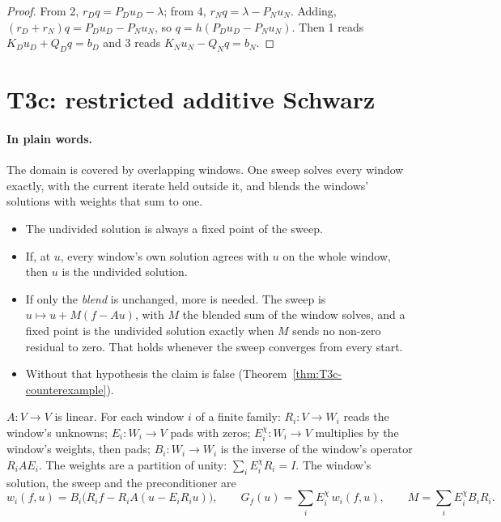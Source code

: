 \begin{proof}
  \leanok
  From 2, $r_Dq=P_Du_D-\lambda$; from 4, $r_Nq=\lambda-P_Nu_N$.  Adding,
  $(r_D+r_N)q=P_Du_D-P_Nu_N$, so $q=h(P_Du_D-P_Nu_N)$.  Then 1 reads
  $K_Du_D+Q_Dq=b_D$ and 3 reads $K_Nu_N-Q_Nq=b_N$.
\end{proof}

\section{T3c: restricted additive Schwarz}

\paragraph{In plain words.}
The domain is covered by overlapping windows.  One sweep solves every window
exactly, with the current iterate held outside it, and blends the windows'
solutions with weights that sum to one.

\begin{itemize}
  \item The undivided solution is always a fixed point of the sweep.
  \item If, at $u$, every window's own solution agrees with $u$ on the whole
    window, then $u$ is the undivided solution.
  \item If only the \emph{blend} is unchanged, more is needed.  The sweep is
    $u\mapsto u+M(f-Au)$, with $M$ the blended sum of the window solves, and a
    fixed point is the undivided solution exactly when $M$ sends no non-zero
    residual to zero.  That holds whenever the sweep converges from every
    start.
  \item Without that hypothesis the claim is false
    (Theorem~\ref{thm:T3c-counterexample}).
\end{itemize}

\begin{definition}\label{def:schwarz}
  \leanok
  $A:V\to V$ is linear.  For each window $i$ of a finite family:
  $R_i:V\to W_i$ reads the window's unknowns; $E_i:W_i\to V$ pads with zeros;
  $E^\chi_i:W_i\to V$ multiplies by the window's weights, then pads;
  $B_i:W_i\to W_i$ is the inverse of the window's operator $R_iAE_i$.  The
  weights are a partition of unity: $\sum_iE^\chi_iR_i=I$.  The window's
  solution, the sweep and the preconditioner are
  \[
    w_i(f,u)=B_i\bigl(R_if-R_iA(u-E_iR_iu)\bigr),\qquad
    G_f(u)=\sum_iE^\chi_i\,w_i(f,u),\qquad
    M=\sum_iE^\chi_iB_iR_i .
  \]
\end{definition}

